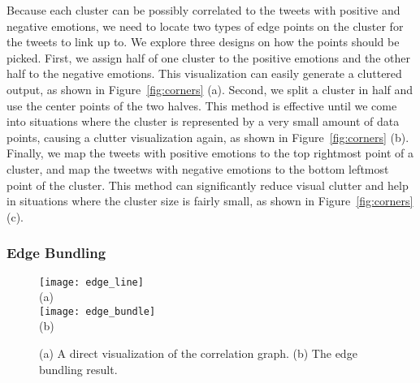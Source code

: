 Because each cluster can be possibly correlated to the tweets with positive and negative emotions, we need to locate two types of edge points on the cluster for the tweets to link up to. We explore three designs on how the points should be picked. First, we assign half of one cluster to the positive emotions and the other half to the negative emotions. This visualization can easily generate a cluttered output, as shown in Figure~\ref{fig:corners} (a). Second, we split a cluster in half and use the center points of the two halves. This method is effective until we come into situations where the cluster is represented by a very small amount of data points, causing a clutter visualization again, as shown in Figure~\ref{fig:corners} (b). Finally, we map the tweets with positive emotions to the top rightmost point of a cluster, and map the tweetws with negative emotions to the bottom leftmost point of the cluster. This method can significantly reduce visual clutter and help in situations where the cluster size is fairly small, as shown in Figure~\ref{fig:corners} (c).





\subsubsection{Edge Bundling}
\label{sec:line}

\begin{figure}[t]
\begin{center}
\texttt{[image: edge\_line]} \\
\mbox{\small{(a)}} \\
\texttt{[image: edge\_bundle]} \\
\mbox{\small{(b)}}
\end{center}
\vspace{-.1in}
\caption{(a) A direct visualization of the correlation graph. (b) The edge bundling result.}
\label{fig:compareline}
\end{figure}

